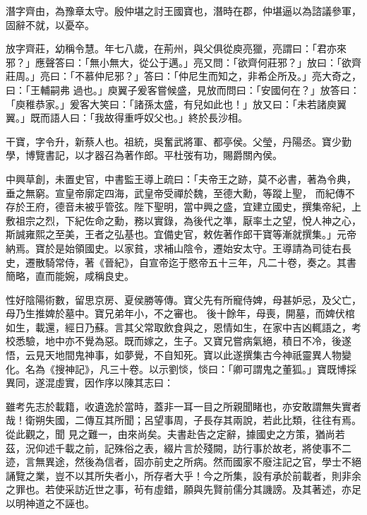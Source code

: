 \begin{pinyinscope}
 潛字齊由，為豫章太守。殷仲堪之討王國寶也，潛時在郡，仲堪逼以為諮議參軍，固辭不就，以憂卒。



 放字齊莊，幼稱令慧。年七八歲，在荊州，與父俱從庾亮獵，亮謂曰：「君亦來邪？」應聲答曰：「無小無大，從公于邁。」亮又問：「欲齊何莊邪？」放曰：「欲齊莊周。」亮曰：「不慕仲尼邪？」答曰：「仲尼生而知之，非希企所及。」亮大奇之，曰：「王輔嗣弗
 過也。」庾翼子爰客嘗候盛，見放而問曰：「安國何在？」放答曰：「庾稚恭家。」爰客大笑曰：「諸孫太盛，有兒如此也！」放又曰：「未若諸庾翼翼。」既而語人曰：「我故得重呼奴父也。」終於長沙相。



 干寶，字令升，新蔡人也。祖統，吳奮武將軍、都亭侯。父瑩，丹陽丞。寶少勤學，博覽書記，以才器召為著作郎。平杜弢有功，賜爵關內侯。



 中興草創，未置史官，中書監王導上疏曰：「夫帝王之跡，莫不必書，著為令典，垂之無窮。宣皇帝廓定四海，武皇帝受禪於魏，至德大勳，等蹤上聖，
 而紀傳不存於王府，德音未被乎管弦。陛下聖明，當中興之盛，宜建立國史，撰集帝紀，上敷祖宗之烈，下紀佐命之勳，務以實錄，為後代之準，厭率土之望，悅人神之心，斯誠雍熙之至美，王者之弘基也。宜備史官，敕佐著作郎干寶等漸就撰集。」元帝納焉。寶於是始領國史。以家貧，求補山陰令，遷始安太守。王導請為司徒右長史，遷散騎常侍，著《晉紀》，自宣帝迄于愍帝五十三年，凡二十卷，奏之。其書簡略，直而能婉，咸稱良史。



 性好陰陽術數，留思京房、夏侯勝等傳。寶父先有所寵侍婢，母甚妒忌，及父亡，母乃生推婢於墓中。寶兄弟年小，不之審也。
 後十餘年，母喪，開墓，而婢伏棺如生，載還，經日乃蘇。言其父常取飲食與之，恩情如生，在家中吉凶輒語之，考校悉驗，地中亦不覺為惡。既而嫁之，生子。又寶兄嘗病氣絕，積日不冷，後遂悟，云見天地間鬼神事，如夢覺，不自知死。寶以此遂撰集古今神祇靈異人物變化。名為《搜神記》，凡三十卷。以示劉惔，惔曰：「卿可謂鬼之董狐。」寶既博採異同，遂混虛實，因作序以陳其志曰：



 雖考先志於載籍，收遺逸於當時，蓋非一耳一目之所親聞睹也，亦安敢謂無失實者哉！衛朔失國，二傳互其所聞；呂望事周，子長存其兩說，若此比類，往往有焉。從此觀之，聞
 見之難一，由來尚矣。夫書赴告之定辭，據國史之方策，猶尚若茲，況仰述千載之前，記殊俗之表，綴片言於殘闕，訪行事於故老，將使事不二迹，言無異途，然後為信者，固亦前史之所病。然而國家不廢注記之官，學士不絕誦覽之業，豈不以其所失者小，所存者大乎！今之所集，設有承於前載者，則非余之罪也。若使采訪近世之事，茍有虛錯，願與先賢前儒分其譏謗。及其著述，亦足以明神道之不誣也。




\end{pinyinscope}
